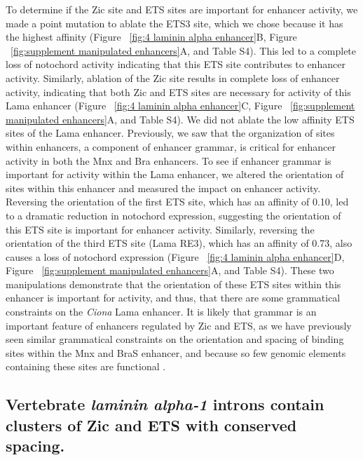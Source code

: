 To determine if the Zic site and ETS sites are important for enhancer activity, we made a point mutation to ablate the ETS3 site, which we chose because it has the highest affinity (Figure ~\ref{fig:4 laminin alpha enhancer}B, Figure ~\ref{fig:supplement manipulated enhancers}A, and Table S4). This led to a complete loss of notochord activity indicating that this ETS site contributes to enhancer activity. Similarly, ablation of the Zic site results in complete loss of enhancer activity, indicating that both Zic and ETS sites are necessary for activity of this Lama enhancer (Figure ~\ref{fig:4 laminin alpha enhancer}C, Figure ~\ref{fig:supplement manipulated enhancers}A, and Table S4). We did not ablate the low affinity ETS sites of the Lama enhancer. Previously, we saw that the organization of sites within enhancers, a component of enhancer grammar, is critical for enhancer activity in both the Mnx and Bra enhancers. To see if enhancer grammar is important for activity within the Lama enhancer, we altered the orientation of sites within this enhancer and measured the impact on enhancer activity. Reversing the orientation of the first ETS site, which has an affinity of 0.10, led to a dramatic reduction in notochord expression, suggesting the orientation of this ETS site is important for enhancer activity. Similarly, reversing the orientation of the third ETS site (Lama RE3), which has an affinity of 0.73, also causes a loss of notochord expression (Figure ~\ref{fig:4 laminin alpha enhancer}D, Figure ~\ref{fig:supplement manipulated enhancers}A, and Table S4). These two manipulations demonstrate that the orientation of these ETS sites within this enhancer is important for activity, and thus, that there are some grammatical constraints on the \textit{Ciona} Lama enhancer. It is likely that grammar is an important feature of enhancers regulated by Zic and ETS, as we have previously seen similar grammatical constraints on the orientation and spacing of binding sites within the Mnx and BraS enhancer, and because so few genomic elements containing these sites are functional \cite{farley2016}. 

\subsection{Vertebrate \textit{laminin alpha-1} introns contain clusters of Zic and ETS with conserved spacing.}

